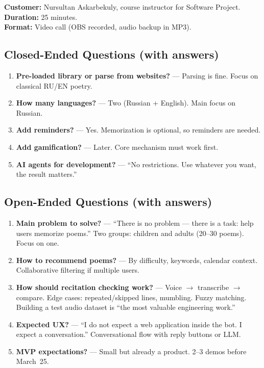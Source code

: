 \documentclass[11pt, a4paper]{article}
\begin{document}
\textbf{Customer:} Nursultan Askarbekuly, course instructor for Software Project.\\
\textbf{Duration:} 25 minutes.\\
\textbf{Format:} Video call (OBS recorded, audio backup in MP3).

\subsection*{Closed-Ended Questions (with answers)}
\begin{enumerate}
    \item \textbf{Pre-loaded library or parse from websites?} --- Parsing is fine. Focus on classical RU/EN poetry.
    \item \textbf{How many languages?} --- Two (Russian + English). Main focus on Russian.
    \item \textbf{Add reminders?} --- Yes. Memorization is optional, so reminders are needed.
    \item \textbf{Add gamification?} --- Later. Core mechanism must work first.
    \item \textbf{AI agents for development?} --- ``No restrictions. Use whatever you want, the result matters.''
\end{enumerate}

\subsection*{Open-Ended Questions (with answers)}
\begin{enumerate}[resume]
    \item \textbf{Main problem to solve?} --- ``There is no problem --- there is a task: help users memorize poems.'' Two groups: children and adults (20--30 poems). Focus on one.
    \item \textbf{How to recommend poems?} --- By difficulty, keywords, calendar context. Collaborative filtering if multiple users.
    \item \textbf{How should recitation checking work?} --- Voice $\rightarrow$ transcribe $\rightarrow$ compare. Edge cases: repeated/skipped lines, mumbling. Fuzzy matching. Building a test audio dataset is ``the most valuable engineering work.''
    \item \textbf{Expected UX?} --- ``I do not expect a web application inside the bot. I expect a conversation.'' Conversational flow with reply buttons or LLM.
    \item \textbf{MVP expectations?} --- Small but already a product. 2--3 demos before March~25.
\end{enumerate}
\end{document}
